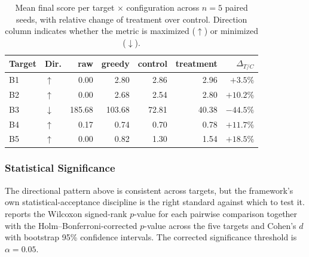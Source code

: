 \begin{table}[t]
  \centering
  \caption{Mean final score per target $\times$ configuration across $n = 5$ paired seeds, with relative change of treatment over control. Direction column indicates whether the metric is maximized ($\uparrow$) or minimized ($\downarrow$).}
  \label{tab:e2e-final-scores}
  \small
  \begin{tabular}{@{}llrrrrr@{}}
    \toprule
    Target & Dir. & raw & greedy & control & treatment & $\Delta_{T/C}$ \\
    \midrule
    B1 & $\uparrow$  & 0.00   & 2.80   & 2.86  & 2.96  & $+3.5\%$  \\
    B2 & $\uparrow$  & 0.00   & 2.68   & 2.54  & 2.80  & $+10.2\%$ \\
    B3 & $\downarrow$ & 185.68 & 103.68 & 72.81 & 40.38 & $-44.5\%$ \\
    B4 & $\uparrow$  & 0.17   & 0.74   & 0.70  & 0.78  & $+11.7\%$ \\
    B5 & $\uparrow$  & 0.00   & 0.82   & 1.30  & 1.54  & $+18.5\%$ \\
    \bottomrule
  \end{tabular}
\end{table}

\subsubsection{Statistical Significance}
\label{sec:end-to-end-significance}

The directional pattern above is consistent across targets, but the framework's own statistical-acceptance discipline is the right standard against which to test it.
 reports the Wilcoxon signed-rank $p$-value for each pairwise comparison together with the Holm--Bonferroni-corrected $p$-value across the five targets and Cohen's $d$ with bootstrap 95\% confidence intervals.
The corrected significance threshold is $\alpha = 0.05$.

